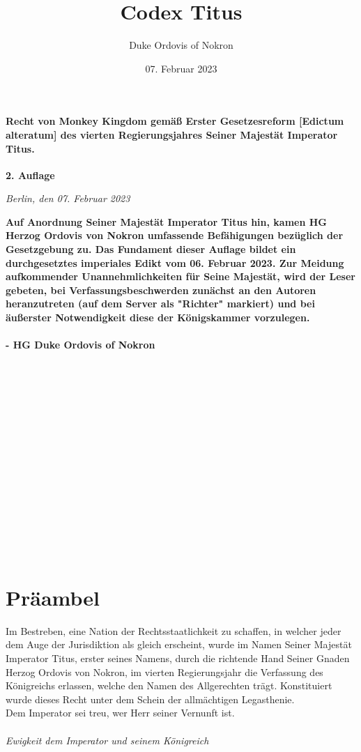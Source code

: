\documentclass{article}
\title{Codex Titus}
\author{Duke Ordovis of Nokron}
\date{07. Februar 2023}
\begin{document}
\maketitle
\vspace*{\fill}
\paragraph{Recht von Monkey Kingdom gemäß Erster Gesetzesreform [Edictum alteratum] des vierten Regierungsjahres Seiner Majestät Imperator Titus.}

\newpage
{}
\vspace*{\fill}
\begin{Center}
\textbf{2. Auflage}
\end{Center}
\begin{flushright}
\textit{Berlin, den 07. Februar 2023}
\end{flushright}
\textbf{Auf Anordnung Seiner Majestät Imperator Titus hin, kamen HG Herzog Ordovis von Nokron umfassende Befähigungen bezüglich der Gesetzgebung zu. Das Fundament dieser Auflage bildet ein durchgesetztes imperiales Edikt vom 06. Februar 2023. Zur Meidung aufkommender Unannehmlichkeiten für Seine Majestät, wird der Leser gebeten, bei Verfassungsbeschwerden zunächst an den Autoren heranzutreten (auf dem Server als "Richter" markiert) und bei äußerster Notwendigkeit diese der Königskammer vorzulegen.}
\\\\
\textbf{- HG Duke Ordovis of Nokron}
\\\\\\\\\\\\\\\\\\\\\\\\\\\\\\\\
\vspace*{\fill}
%
\newpage
\tableofcontents
\newpage
\section{Präambel}
Im Bestreben, eine Nation der Rechtsstaatlichkeit zu schaffen, in welcher jeder dem Auge der Jurisdiktion als gleich erscheint, wurde im Namen 
Seiner Majestät Imperator Titus, erster seines Namens, durch die richtende Hand Seiner Gnaden Herzog Ordovis von Nokron, im vierten Regierungsjahr
die Verfassung des Königreichs erlassen, welche den Namen des Allgerechten trägt. Konstituiert wurde dieses Recht unter dem Schein der
allmächtigen Legasthenie.\\
Dem Imperator sei treu, wer Herr seiner Vernunft ist.\\\\
\textit{Ewigkeit dem Imperator und seinem Königreich}
\newpage
\end{document}
